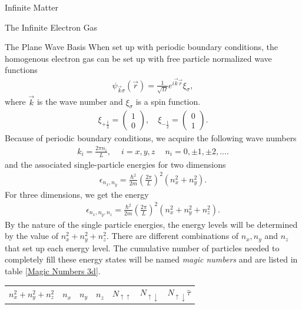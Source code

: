 \documentclass[twoside,english]{uiofysmaster}
\begin{document}
\begin{chapter}{Infinite Matter}
\begin{section}{The Infinite Electron Gas}
		\begin{subsection}{The Plane Wave Basis}
			When set up with periodic boundary conditions, the homogenous electron gas can be set up with free particle normalized wave functions
			\begin{align}
				\psi_{\vec k \sigma} (\vec r) = \frac{1}{\sqrt{\Omega}} e^{i \vec k \vec r} \xi_{\sigma},
			\end{align}
			where $\vec k$ is the wave number and $\xi_{\sigma}$ is a spin function. 
			\begin{align}
				\xi_{+\frac{1}{2}} = \left( \begin{matrix} 1 \\ 0 \end{matrix} \right), \:\;\:\; \xi_{-\frac{1}{2}} = \left( \begin{matrix} 0 \\ 1 \end{matrix} \right).
			\end{align}
			Because of periodic boundary conditions, we acquire the following wave numbers
			\begin{align}
				k_i = \frac{2\pi n_i}{L}, \:\:\:\;\; i = x,y,z \;\;\:\:\: n_i = 0, \pm 1, \pm 2, ... .
			\end{align}
			and the associated single-particle energies for two dimensions
			\begin{align}
				\epsilon_{n_x,n_y} = \frac{\hbar^2}{2m} \left( \frac{2\pi}{L} \right)^2 (n_x^2 + n_y^2).
			\end{align}
			For three dimensions, we get the energy 
			\begin{align}
				\epsilon_{n_x,n_y,n_z} = \frac{\hbar^2}{2m} \left( \frac{2\pi}{L} \right)^2 (n_x^2 + n_y^2 + n_z^2 ).
			\end{align}
			By the nature of the single particle energies, the energy levels will be determined by the value of $n_x^2 + n_y^2 + n_z^2$. There are different combinations of $n_x, n_y$ and $n_z$ that set up each energy level. The cumulative number of particles needed to completely fill these energy states will be named \textit{magic numbers} and are listed in table \ref{Magic Numbers 3d}. 
			\begin{table}[H]
				\begin{center}
					\begin{tabular}[center]{l | c c c | c | c | r }
						$n_x^2 + n_y^2 + n_z^2$ & $n_x$ & $n_y$ & $n_z$ & $N_{\uparrow \uparrow}$ & $N_{\uparrow \downarrow}$ & $N_{\uparrow \downarrow} \hat \tau$ \\

\end{tabular}
\end{center}
\end{table}
\end{subsection}
\end{section}
\end{chapter}
\end{document}
